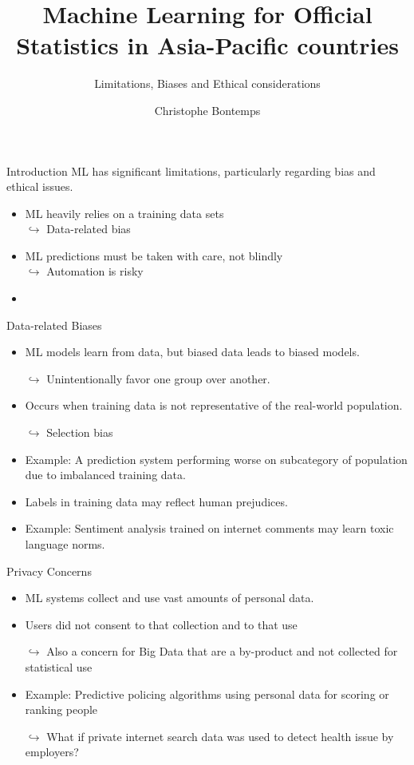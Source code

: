 \documentclass[xcolor=x11names,compress]{beamer}
\title{\textcolor{siap}{Machine Learning for Official Statistics in Asia-Pacific countries \\ \vspace{0.5cm} }}
\subtitle{\textcolor{brique}{\Large{Limitations, Biases and Ethical considerations}}}
\author{\textcolor{siap}{Christophe Bontemps}}
\institute{ \texttt{[image: SIAP\_logo\_Big.png]}}
\date{}
\renewcommand{\(}{\begin{columns}}
\renewcommand{\)}{\end{columns}}
\newcommand{\<}[1]{\begin{column}{#1}}
\renewcommand{\>}{\end{column}}
\begin{document}
\begin{frame}
  \titlepage
\end{frame}


\begin{frame}{Introduction}
ML has significant limitations, particularly regarding bias and ethical issues.
    \begin{itemize}[<+->]
        \item ML heavily  relies on a training data sets \\
         $\hookrightarrow$  Data-related bias
        \item ML predictions must be taken with care, not blindly\\
         $\hookrightarrow$ Automation is risky
        \item 
    \end{itemize}
\end{frame}

\begin{frame}{Data-related Biases}
    \begin{itemize}[<+->]
        \item ML models learn from data, but biased data leads to biased models.\\
         \item[$\hookrightarrow$]  Unintentionally favor one group over another.
        \item Occurs when training data is not representative of the real-world population. \\
         \item[$\hookrightarrow$] Selection bias
        \item Example: A prediction system performing worse on subcategory of population due to imbalanced training data.
        \item Labels in training data may reflect human prejudices.
        \item Example: Sentiment analysis trained on internet comments may learn toxic language norms.
    \end{itemize}
\end{frame}


\begin{frame}{Privacy Concerns}
    \begin{itemize}[<+->]
        \item ML systems collect and use vast amounts of personal data.
        \item Users did not consent to that collection and to that use
        \item[$\hookrightarrow$]  Also a concern for Big Data that are a by-product and not collected for statistical use
        \item Example: Predictive policing algorithms using personal data for scoring or ranking people 
         \item[$\hookrightarrow$] What if private internet search data was used to detect health issue by employers? 
    \end{itemize}
\end{frame}
\end{document}
